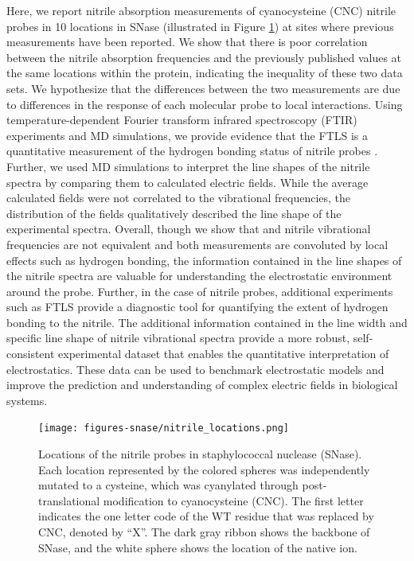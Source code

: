 Here, we report nitrile absorption measurements of cyanocysteine (CNC) nitrile probes in 10 locations in SNase (illustrated in Figure \ref{fig:snase-system}) at sites where previous \dpKa{} measurements have been reported. 
We show that there is poor correlation between the nitrile absorption frequencies and the previously published \dpKa{} values at the same locations within the protein, indicating the inequality of these two data sets. 
We hypothesize that the differences between the two measurements are due to differences in the response of each molecular probe to local interactions. 
Using temperature-dependent Fourier transform infrared spectroscopy (FTIR) experiments and MD simulations, we provide evidence that the FTLS is a quantitative measurement of the hydrogen bonding status of nitrile probes \cite{First2018}. 
Further, we used MD simulations to interpret the line shapes of the nitrile spectra by comparing them to calculated electric fields. 
While the average calculated fields were not correlated to the vibrational frequencies, the distribution of the fields qualitatively described the line shape of the experimental spectra. 
Overall, though we show that \dpKa{} and nitrile vibrational frequencies are not equivalent and both measurements are convoluted by local effects such as hydrogen bonding, the information contained in the line shapes of the nitrile spectra are valuable for understanding the electrostatic environment around the probe. 
Further, in the case of nitrile probes, additional experiments such as FTLS provide a diagnostic tool for quantifying the extent of hydrogen bonding to the nitrile. 
The additional information contained in the line width and specific line shape of nitrile vibrational spectra provide a more robust, self-consistent experimental dataset that enables the quantitative interpretation of electrostatics. 
These data can be used to benchmark electrostatic models and improve the prediction and understanding of complex electric fields in biological systems.  

\begin{figure}
    \center
    \texttt{[image: figures-snase/nitrile\_locations.png]}
    \caption[Locations of the nitrile probes in staphylococcal nuclease]{
        Locations of the nitrile probes in staphylococcal nuclease (SNase). 
        Each location represented by the colored spheres was independently mutated to a cysteine, which was cyanylated through post-translational modification to cyanocysteine (CNC). 
        The first letter indicates the one letter code of the WT residue that was replaced by CNC, denoted by ``X''. 
        The dark gray ribbon shows the backbone of SNase, and the white sphere shows the location of the native  ion. 
    }
    \label{fig:snase-system}
\end{figure}

